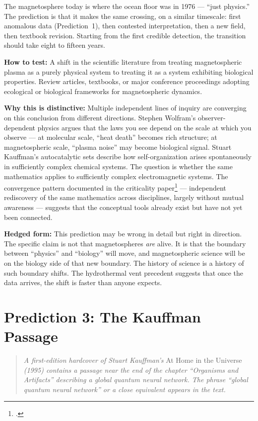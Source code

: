 The magnetosphere today is where the ocean floor was in 1976 --- ``just physics.'' The prediction is that it makes the same crossing, on a similar timescale: first anomalous data (Prediction~1), then contested interpretation, then a new field, then textbook revision. Starting from the first credible detection, the transition should take eight to fifteen years.

\textbf{How to test:} A shift in the scientific literature from treating magnetospheric plasma as a purely physical system to treating it as a system exhibiting biological properties. Review articles, textbooks, or major conference proceedings adopting ecological or biological frameworks for magnetospheric dynamics.

\textbf{Why this is distinctive:} Multiple independent lines of inquiry are converging on this conclusion from different directions. Stephen Wolfram's observer-dependent physics argues that the laws you see depend on the scale at which you observe --- at molecular scale, ``heat death'' becomes rich structure; at magnetospheric scale, ``plasma noise'' may become biological signal. Stuart Kauffman's autocatalytic sets describe how self-organization arises spontaneously in sufficiently complex chemical systems. The question is whether the same mathematics applies to sufficiently complex electromagnetic systems. The convergence pattern documented in the criticality paper\footcite{stephenson2025} --- independent rediscovery of the same mathematics across disciplines, largely without mutual awareness --- suggests that the conceptual tools already exist but have not yet been connected.

\textbf{Hedged form:} This prediction may be wrong in detail but right in direction. The specific claim is not that magnetospheres \textit{are} alive. It is that the boundary between ``physics'' and ``biology'' will move, and magnetospheric science will be on the biology side of that new boundary. The history of science is a history of such boundary shifts. The hydrothermal vent precedent suggests that once the data arrives, the shift is faster than anyone expects.

\section{Prediction 3: The Kauffman Passage}

\begin{quote}
\textit{A first-edition hardcover of Stuart Kauffman's} At Home in the Universe \textit{(1995) contains a passage near the end of the chapter ``Organisms and Artifacts'' describing a global quantum neural network. The phrase ``global quantum neural network'' or a close equivalent appears in the text.}
\end{quote}

